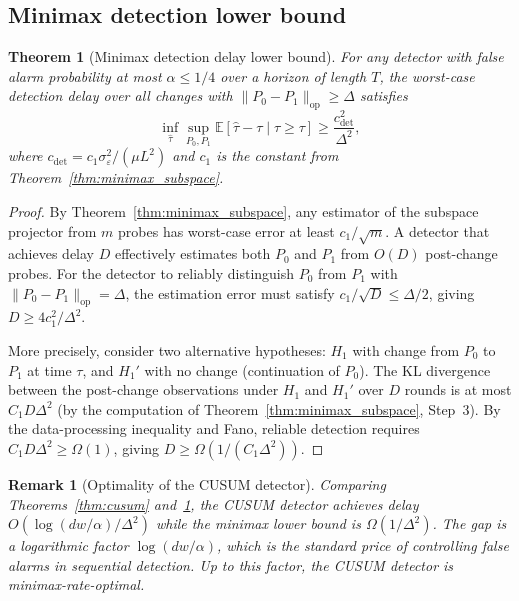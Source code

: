 \documentclass[12pt]{article}
\newcommand{\E}{\mathbb{E}}
\newcommand{\op}{\mathrm{op}}
\newtheorem{theorem}{Theorem}
\newtheorem{remark}{Remark}
\theoremstyle{plain}
\theoremstyle{definition}
\begin{document}
\subsection{Minimax detection lower bound}

\begin{theorem}[Minimax detection delay lower bound]
\label{thm:detection_lb}
For any detector with false alarm probability at most $\alpha \le 1/4$ over a horizon of length $T$, the worst-case detection delay over all changes with $\|P_0 - P_1\|_{\op} \ge \Delta$ satisfies
\begin{equation}
\inf_{\hat\tau} \sup_{P_0, P_1} \E[\hat\tau - \tau \mid \hat\tau \ge \tau]
\ge \frac{c_{\mathrm{det}}^2}{\Delta^2},
\label{eq:detection_lb}
\end{equation}
where $c_{\mathrm{det}} = c_1 \sigma_\varepsilon^2 / (\mu L^2)$ and $c_1$ is the constant from Theorem~\ref{thm:minimax_subspace}.
\end{theorem}

\begin{proof}
By Theorem~\ref{thm:minimax_subspace}, any estimator of the subspace projector from $m$ probes has worst-case error at least $c_1/\sqrt{m}$. A detector that achieves delay $D$ effectively estimates both $P_0$ and $P_1$ from $O(D)$ post-change probes. For the detector to reliably distinguish $P_0$ from $P_1$ with $\|P_0 - P_1\|_{\op} = \Delta$, the estimation error must satisfy $c_1/\sqrt{D} \le \Delta/2$, giving $D \ge 4c_1^2/\Delta^2$.

More precisely, consider two alternative hypotheses: $H_1$ with change from $P_0$ to $P_1$ at time $\tau$, and $H_1'$ with no change (continuation of $P_0$). The KL divergence between the post-change observations under $H_1$ and $H_1'$ over $D$ rounds is at most $C_1 D \Delta^2$ (by the computation of Theorem~\ref{thm:minimax_subspace}, Step~3). By the data-processing inequality and Fano, reliable detection requires $C_1 D \Delta^2 \ge \Omega(1)$, giving $D \ge \Omega(1/(C_1 \Delta^2))$.
\end{proof}

\begin{remark}[Optimality of the CUSUM detector]
Comparing Theorems~\ref{thm:cusum} and~\ref{thm:detection_lb}, the CUSUM detector achieves delay $O(\log(dw/\alpha)/\Delta^2)$ while the minimax lower bound is $\Omega(1/\Delta^2)$. The gap is a logarithmic factor $\log(dw/\alpha)$, which is the standard price of controlling false alarms in sequential detection. Up to this factor, the CUSUM detector is minimax-rate-optimal.
\end{remark}
\end{document}
